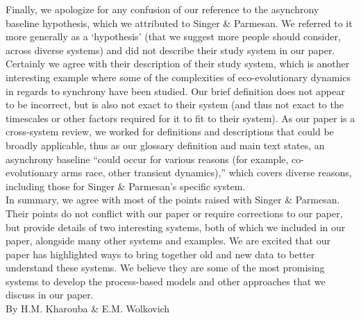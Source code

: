 \documentclass[11pt,letter]{article}
\begin{document}
Finally, we apologize for any confusion of our reference to the asynchrony baseline hypothesis, which we attributed to Singer \& Parmesan. We referred to it more generally as a `hypothesis' (that we suggest more people should consider, across diverse systems) and did not describe their study system in our paper. Certainly we agree with their description of their study system, which is another interesting example where some of the complexities of eco-evolutionary dynamics in regards to synchrony have been studied. Our brief definition does not appear to be incorrect, but is also not exact to their system (and thus not exact to the timescales or other factors required for it to fit to their system).  As our paper is a cross-system review, we worked for definitions and descriptions that could be broadly applicable, thus as our glossary definition and main text states, an asynchrony baseline ``could occur for various reasons (for example, co-evolutionary arms race, other transient dynamics),'' which covers diverse reasons, including those for Singer \& Parmesan's specific system.\\

In summary, we agree with most of the points raised with Singer \& Parmesan. Their points do not conflict with our paper or require corrections to our paper, but provide details of two interesting systems, both of which we included in our paper, alongside many other systems and examples. We are excited that our paper has highlighted ways to bring together old and new data to better understand these systems. We believe they are some of the most promising systems to develop the process-based models and other approaches that we discuss in our paper. \\

By H.M. Kharouba \& E.M. Wolkovich

\begin{footnotesize}

\end{footnotesize}
\end{document}
